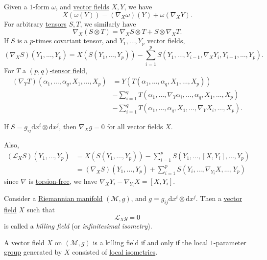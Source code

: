 Given a \(1\)-form \(\omega \), and \hyperref[def:vector-field]{vector fields} \(X, Y\), we have
\[
	X(\omega (Y)) = (\nabla _X \omega )(Y) + \omega (\nabla _X Y).
\]
For arbitrary \hyperref[def:tensor]{tensors} \(S, T\), we similarly have
\[
	\nabla _X (S \otimes T) = \nabla _X S \otimes T + S \otimes \nabla _X T.
\]
If \(S\) is a \(p\)-times covariant tensor, and \(Y_1, \dots , Y_p\) \hyperref[def:vector-field]{vector fields},
\[
	(\nabla _X S) ( Y_1, \dots , Y_p) = X(S(Y_1, \dots , Y_p)) - \sum_{i=1}^{p} S(Y_1, \dots , Y_{i-1}, \nabla _X Y_i, Y_{i+1}, \dots , Y_p ).
\]
For \(T\) a \hyperref[def:tensor]{\((p, q)\)-tensor field},
\[
	\begin{split}
		(\nabla _Y T) ( \alpha _1, \dots , \alpha _q, X_1, \dots , X_p)
		&= Y(T(\alpha _1, \dots , \alpha _q, X_1, \dots , X_p))\\
		&- \sum_{i=1}^{q} T(\alpha _1, \dots , \nabla _Y \alpha _i, \dots , \alpha _q , X_1, \dots , X_p)\\
		&- \sum_{i=1}^{q} T(\alpha _1, \dots , \alpha _q, X_1, \dots , \nabla _Y X_i, \dots , X_p).
	\end{split}
\]

If \(S = g_{ij} \mathrm{d} x^i \otimes \mathrm{d} x^j\), then \(\nabla _X g = 0\) for all \hyperref[def:vector-field]{vector fields} \(X\).

Also,
\[
	\begin{split}
		(\mathcal{L} _X S) (Y_1, \dots , Y_p)
		&=X(S(Y_1, \dots , Y_p))
		- \sum_{i=1}^{p} S(Y_1, \dots , [X, Y_i], \dots , Y_p)\\
		&= (\nabla _X S)(Y_1, \dots , Y_p) + \sum_{i=1}^{p} S(Y_i, \dots , \nabla _{Y_i}X, \dots , Y_p)
	\end{split}
\]
since \(\nabla \) is \hyperref[def:torsion-free]{torsion-free}, we have \(\nabla _X Y_i - \nabla _{Y_i}X = [X, Y_i]\).

\begin{definition}\label{def:killing-field}
	Consider a \hyperref[def:Riemannian-manifold]{Riemannian manifold} \((\mathcal{M} , g)\), and \(g = g_{ij} \mathrm{d} x^i \otimes \mathrm{d} x^j \). Then a \hyperref[def:vector-field]{vector field} \(X\) such that
	\[
		\mathcal{L} _X g = 0
	\]
	is called a \emph{killing field} (or \emph{infinitesimal isometry}).
\end{definition}

\begin{lemma}
	A \hyperref[def:vector-field]{vector field} \(X\) on \((\mathcal{M} , g)\) is a \hyperref[def:killing-field]{killing field} if and only if the \hyperref[def:local-1-parameter-group]{local \(1\)-parameter group} generated by \(X\) consisted of \hyperref[def:local-isometry]{local isometries}.
\end{lemma}

